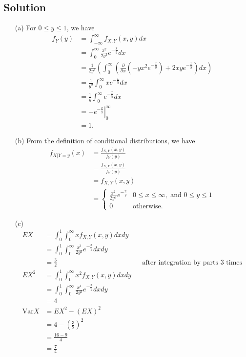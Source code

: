\documentclass[10pt,a4paper]{article}
\theoremstyle{theorem}
\theoremstyle{definition}
\begin{document}
\subsection*{Solution}
\begin{enumerate}
\item[(a)] For $0 \leq y \leq 1$, we have
\begin{align*}
f_Y(y) &= \int_{-\infty}^{\infty} f_{X, Y}(x, y) dx\\
&= \int_{0}^{\infty} \frac{x^2}{2 y^3} e^{- \frac{x}{y}} dx\\
&= \frac{1}{2 y^3} \left( \int_{0}^{\infty} \left(\frac{\partial}{\partial x} (-yx^2 e^{- \frac{x}{y}}) + 2xy e^{- \frac{x}{y}}\right) dx \right)\\
&= \frac{1}{y^2} \int_{0}^{\infty} x e^{- \frac{x}{y}} dx\\
&= \frac{1}{y} \int_{0}^{\infty} e^{- \frac{x}{y}} dx\\
&= \left. - e^{- \frac{x}{y}} \right|_{0}^\infty\\
&= \boxed{1}.
\end{align*}

\item[(b)] From the definition of conditional distributions, we have
\begin{align*}
f_{X|Y = y}(x) &= \frac{f_{X, Y}(x, y)}{f_Y(y)}\\
&= \frac{f_{X, Y}(x, y)}{f_Y(y)}\\
&= f_{X, Y}(x, y)\\
&= \boxed{\begin{cases} 
      \frac{x^2}{2 y^3} e^{- \frac{x}{y}} & 0 \leq x \leq \infty, \text{ and } 0 \leq y \leq 1 \\
      0 & \text{otherwise.}
   \end{cases}}
\end{align*}

\item[(c)] 
\begin{align*}
EX &= \int_0^1 \int_0^\infty x f_{X, Y}(x, y) dx dy\\
&= \int_0^1 \int_0^\infty \frac{x^3}{2 y^3} e^{- \frac{x}{y}} dx dy\\
&= \boxed{\frac{3}{2}} && \text{after integration by parts 3 times}\\
EX^2 &= \int_0^1 \int_0^\infty x^2 f_{X, Y}(x, y) dx dy\\
&= \int_0^1 \int_0^\infty \frac{x^4}{2 y^3} e^{- \frac{x}{y}} dx dy\\ 
&= 4\\
\text{Var}X &= EX^2 - (EX)^2\\
&= 4 - (\frac{3}{2})^2\\
&= \frac{16 - 9}{4}\\
&= \boxed{\frac{7}{4}}
\end{align*}
\end{enumerate}
\end{document}
